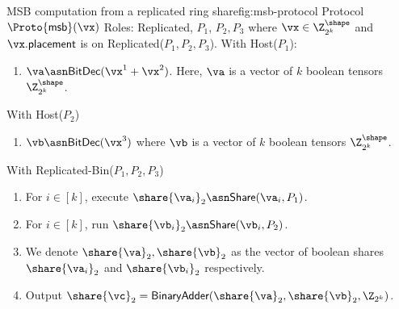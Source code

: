 \begin{Boxfig}{MSB computation from a replicated ring share}{fig:msb-protocol}
  {Protocol $\Proto{\mathsf{msb}}(\vx)$}
  Roles: Replicated, $P_1$, $P_2, P_3$ where $\vx \in \Z_{2^k}^\shape$ and
  $\vx.\mathsf{placement}$ is on Replicated($P_1, P_2, P_3$). \newline
  With Host($P_1$):
  \begin{enumerate}
    \item $\va \asn \textsf{BitDec}(\vx^1 + \vx^2)$. Here, $\va$ is a vector of $k$ boolean tensors $\Z_{2^k}^\shape$.
  \end{enumerate}
  With Host($P_2$)
  \begin{enumerate}
    \item $\vb \asn \textsf{BitDec}(\vx^3)$ where $\vb$ is a vector of $k$ boolean tensors $\Z_{2^k}^\shape$.
  \end{enumerate}
  With Replicated-Bin($P_1, P_2, P_3$)
  \begin{enumerate}
    \item For $i \in [k]$, execute $\share{\va_i}_2 \asn \mathsf{Share}(\va_i, P_1)$.
    \item For $i \in [k]$, run $\share{\vb_i}_2 \asn \mathsf{Share}(\vb_i, P_2)$.
    \item We denote $\share{\va}_2, \share{\vb}_2$ as the vector of boolean shares
    $\share{\va_i}_2$ and $\share{\vb_i}_2$ respectively.
    \item Output $\share{\vc}_2 = \textsf{BinaryAdder}(\share{\va}_2, \share{\vb}_2, \Z_{2^k})$.
  \end{enumerate}

\end{Boxfig}

